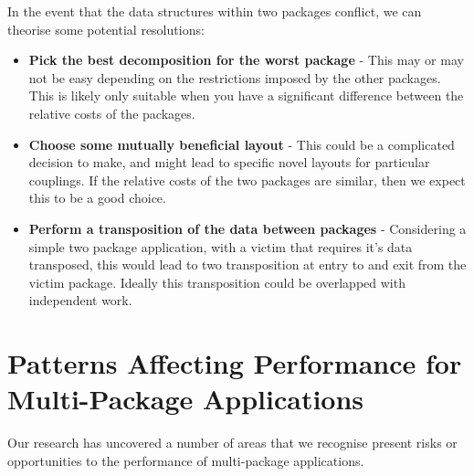 \documentclass[runningheads,a4paper]{llncs}
\begin{document}
In the event that the data structures within two packages conflict, we can theorise some potential resolutions:

\begin{itemize}
  \item \textbf{Pick the best decomposition for the worst package} - This may or may not be easy depending on the restrictions imposed by the other packages. This is likely only suitable when you have a significant difference between the relative costs of the packages.
  \item \textbf{Choose some mutually beneficial layout} - This could be a complicated decision to make, and might lead to specific novel layouts for particular couplings. If the relative costs of the two packages are similar, then we expect this to be a good choice.
  \item \textbf{Perform a transposition of the data between packages} - Considering a simple two package application, with a victim that requires it's data transposed, this would lead to two transposition at entry to and exit from the victim package. Ideally this transposition could be overlapped with independent work.
\end{itemize}

\section{Patterns Affecting Performance for Multi-Package Applications}

Our research has uncovered a number of areas that we recognise present risks or opportunities to the performance of multi-package applications. 
\end{document}
